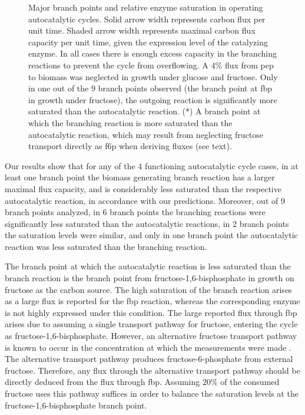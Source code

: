 \begin{figure}[!htb]
\centering
\resizebox{1\linewidth}{!}{
    
}
\caption{
  Major branch points and relative enzyme saturation in operating autocatalytic cycles.
  Solid arrow width represents carbon flux per unit time.
  Shaded arrow width represents maximal carbon flux capacity per unit time, given the expression level of the catalyzing enzyme.
  In all cases there is enough excess capacity in the branching reactions to prevent the cycle from overflowing.
  A $4\%$ flux from pep to biomass was neglected in growth under glucose and fructose.
  Only in one out of the 9 branch points observed (the branch point at fbp in growth under fructose), the outgoing reaction is significantly more saturated than the autocatalytic reaction.
  (*) A branch point at which the branching reaction is more saturated than the autocatalytic reaction, which may result from neglecting fructose transport directly as f6p when deriving fluxes (see text).
}
    \label{fig:branch}
\end{figure}

    Our results show that for any of the 4 functioning autocatalytic cycle cases, in at least one branch point the biomass generating branch reaction has a larger maximal flux capacity, and is considerably less saturated than the respective autocatalytic reaction, in accordance with our predictions.
    Moreover, out of 9 branch points analyzed, in 6 branch points the branching reactions were significantly less saturated than the autocatalytic reactions, in 2 branch points the saturation levels were similar, and only in one branch point the autocatalytic reaction was less saturated than the branching reaction.

    The branch point at which the autocatalytic reaction is less saturated than the branch reaction is the branch point from fructose-1,6-bisphosphate in growth on fructose as the carbon source.
    The high saturation of the branch reaction arises as a large flux is reported for the fbp reaction, whereas the corresponding enzyme is not highly expressed under this condition.
    The large reported flux through fbp arises due to assuming a single transport pathway for fructose, entering the cycle as fructose-1,6-bisphosphate.
    However, an alternative fructose transport pathway is known to occur in the concentration at which the measurements were made \cite{Kornberg1990-ft}.
    The alternative transport pathway produces fructose-6-phosphate from external fructose.
    Therefore, any flux through the alternative transport pathway should be directly deduced from the flux through fbp.
    Assuming $20\%$ of the consumed fructose uses this pathway suffices in order to balance the saturation levels at the fructose-1,6-bisphosphate branch point.

